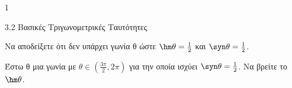 \begin{ylh}{1}
\item 3.2 Βασικές Τριγωνομετρικές Ταυτότητες
\end{ylh}
\begin{alist}
\item Να αποδείξετε ότι δεν υπάρχει γωνία θ ώστε $\hm \theta = \frac{1}{2}$ και $\syn \theta = \frac{1}{2}$.
\item Έστω θ μια γωνία με $\theta \in \left(\frac{3\pi}{2}, 2\pi\right)$ για την οποία ισχύει $\syn \theta = \frac{1}{2}$. Να βρείτε το $\hm \theta$.
\end{alist}

